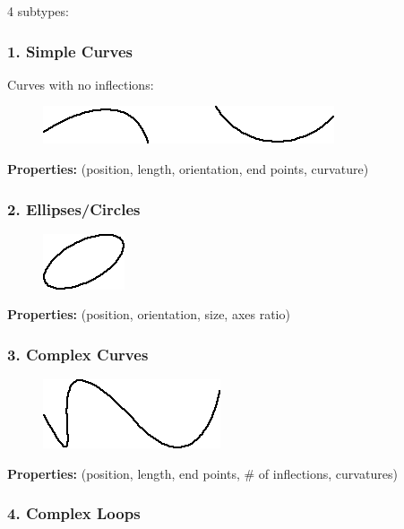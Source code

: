 4 subtypes:

\subsubsection{1. Simple Curves}

Curves with no inflections:

\begin{figure}[H]
\centering
\includegraphics[scale=0.7, bb=0 0 325 42]{CurvesClasses.PNG}
\end{figure}

\textbf{Properties:} (position, length, orientation, end points, curvature)

\subsubsection{2. Ellipses/Circles}

\begin{figure}[H]
\centering
\includegraphics[scale=0.7, bb=0 0 91 62]{EllipsesClasses.PNG}
\end{figure}

\textbf{Properties:} (position, orientation, size, axes ratio)

\subsubsection{3. Complex Curves}

\begin{figure}[H]
\centering
\includegraphics[scale=0.7, bb=0 0 198 77]{ComplexCurves.PNG}
\end{figure}

\textbf{Properties:} (position, length, end points, \# of inflections, curvatures) 

\subsubsection{4. Complex Loops}

